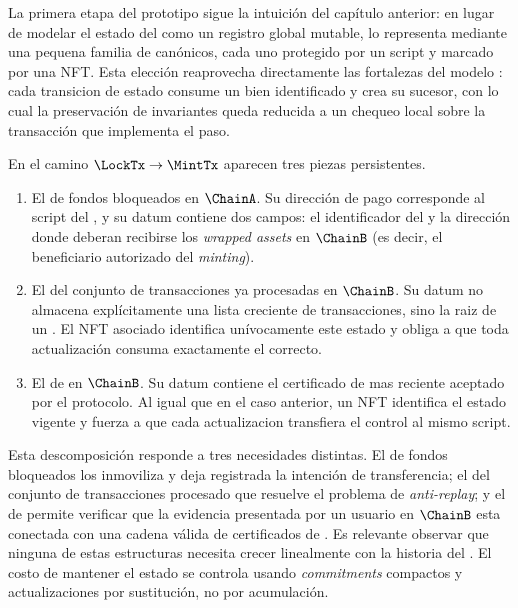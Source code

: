 La primera etapa del prototipo sigue la intuición del capítulo anterior: en lugar de modelar el estado del \zkBridge como un registro global mutable, lo representa mediante una pequena familia de \UTxOs canónicos, cada uno protegido por un script y marcado por una NFT. Esta elección reaprovecha directamente las fortalezas del modelo \eUTxO \cite{Chakravarty2020}: cada transicion de estado consume un \UTxO bien identificado y crea su sucesor, con lo cual la preservación de invariantes queda reducida a un chequeo local sobre la transacción que implementa el paso.

En el camino $\LockTx \rightarrow \MintTx$ aparecen tres piezas persistentes.

\begin{enumerate}[noitemsep]
  \item El \UTxO de fondos bloqueados en $\ChainA$. Su dirección de pago corresponde al script del \UnlockingValidator, y su datum contiene dos campos: el identificador del \zkBridge y la dirección donde deberan recibirse los \textit{wrapped assets} en $\ChainB$ (es decir, el beneficiario autorizado del \textit{minting}).
  \item El \UTxO del conjunto de transacciones ya procesadas en $\ChainB$. Su datum no almacena explícitamente una lista creciente de transacciones, sino la raiz de un \SMT. El NFT asociado identifica unívocamente este estado y obliga a que toda actualización consuma exactamente el \UTxO correcto.
  \item El \UTxO de \StakeDistribution en $\ChainB$. Su datum contiene el certificado de \Mithril mas reciente aceptado por el protocolo. Al igual que en el caso anterior, un NFT identifica el estado vigente y fuerza a que cada actualizacion transfiera el control al mismo script.
\end{enumerate}

Esta descomposición responde a tres necesidades distintas. El \UTxO de fondos bloqueados los inmoviliza y deja registrada \Onchain la intención de transferencia; el \UTxO del conjunto de transacciones procesado que resuelve el problema de \textit{anti-replay}; y el \UTxO de \StakeDistribution permite verificar que la evidencia presentada por un usuario en $\ChainB$ esta conectada con una cadena válida de certificados de \Mithril. Es relevante observar que ninguna de estas estructuras necesita crecer linealmente con la historia del \zkBridge. El costo de mantener el estado se controla usando \textit{commitments} compactos y actualizaciones por sustitución, no por acumulación.

